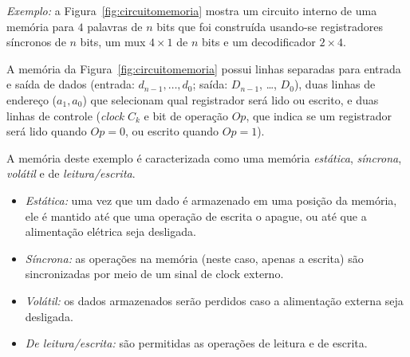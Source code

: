 \documentclass[a4paper,12pt,notitlepage]{article}
\begin{document}
\emph{Exemplo:} a Figura~\ref{fig:circuitomemoria} mostra um circuito interno
de uma memória para $4$ palavras de $n$ bits que foi construída usando-se
registradores síncronos de $n$ bits, um mux $4\times1$ de $n$ bits
e um decodificador $2\times4$.

A memória da Figura~\ref{fig:circuitomemoria} possui linhas separadas para
entrada e saída de dados (entrada: $d_{n-1}, \ldots, d_0$;
saída: $D_{n-1}$, \ldots, $D_0$), duas linhas de endereço ($a_1, a_0$) que
selecionam qual registrador será lido ou escrito, e duas linhas de controle
(\emph{clock} $C_k$ e bit de operação $Op$, que indica se um registrador será
lido quando $Op=0$, ou escrito quando $Op=1$).

A memória deste exemplo é caracterizada como uma memória \emph{estática},
\emph{síncrona}, \emph{volátil} e de \emph{leitura/escrita}.

\begin{itemize}
\item \emph{Estática:} uma vez que um dado é armazenado em uma posição
      da memória, ele é mantido até que uma operação de escrita o
      apague, ou até que a alimentação elétrica seja desligada.
\item \emph{Síncrona:} as operações na memória (neste caso, apenas a
      escrita) são sincronizadas por meio de um sinal de clock externo.
\item \emph{Volátil:} os dados armazenados serão perdidos caso a alimentação
      externa seja desligada.
\item \emph{De leitura/escrita:} são permitidas as operações de leitura e
      de escrita.
\end{itemize}
\end{document}
